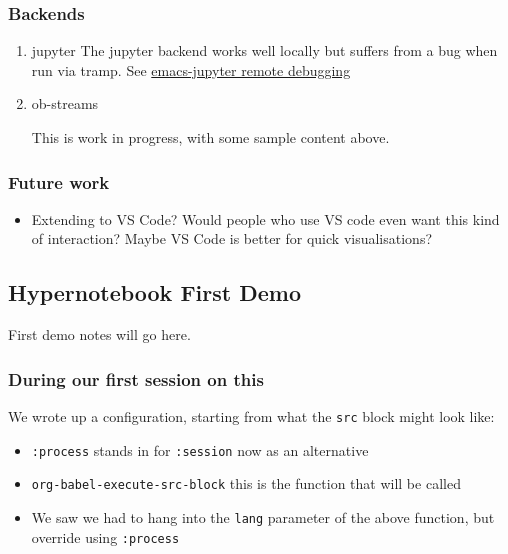 \documentclass[11pt]{article}
\begin{document}
\subsubsection{Backends}
\label{sec:org0bc7684}
\begin{enumerate}
\item jupyter
\label{sec:orgd0a8489}
The jupyter backend works well locally but suffers from a bug when run via tramp. See \hyperref[sec:org849b335]{emacs-jupyter remote debugging}

\item ob-streams
\label{sec:orgeef23fb}

This is work in progress, with some sample content above.
\end{enumerate}

\subsubsection{Future work}
\label{sec:org74f5a3f}

\begin{itemize}
\item Extending to VS Code?  Would people who use VS code even want this kind of interaction?  Maybe VS Code is better for quick visualisations?
\end{itemize}
\subsection{Hypernotebook First Demo}
\label{sec:org8a3e157}

First demo notes will go here.

\subsubsection{During our first session on this}
\label{sec:orgadd3803}

We wrote up a configuration, starting from what the \texttt{src} block might
look like:

\begin{itemize}
\item \texttt{:process} stands in for \texttt{:session} now as an alternative
\item \texttt{org-babel-execute-src-block} this is the function that will be called
\item We saw we had to hang into the \texttt{lang} parameter of the above function, but override using \texttt{:process}
\end{itemize}
\end{document}
